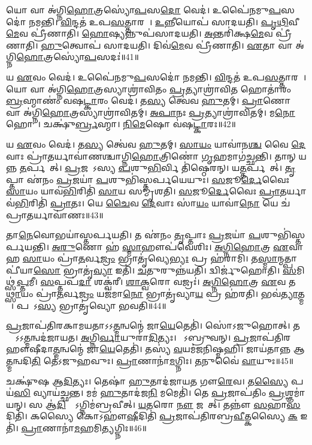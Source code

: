 𑌯𑍋 𑌵𑌾 𑌅॑𑌗𑍍𑌨𑌿\ul{𑌹𑍋}𑌤𑍍𑌰𑌸𑍍𑌯𑍋॑\ul{𑌪}𑌸\ul{𑌦𑍋} 𑌵𑍇𑌦॑।
𑌉𑌪𑍈॑𑌨𑌮𑍁\ul{𑌪}𑌸𑌦𑍋॑ 𑌨𑌮𑌨𑍍𑌤𑌿।
\ul{𑌵𑌿}𑌨𑍍𑌦𑌤॑ 𑌉𑌪\ul{𑌸}𑌤𑍍𑌤𑌾𑌰𑌮𑍍᳚।
\ul{𑌉}𑌨𑍍𑌨𑍀𑌯𑍋𑌪॑ 𑌸𑌾𑌦𑌯𑌤𑌿।
\ul{𑌪𑍃}\ul{𑌥𑌿}𑌵𑍀\ul{𑌮𑍇}𑌵 𑌪𑍍𑌰𑍀॑𑌣𑌾𑌤𑌿।
\ul{𑌹𑍋}𑌷𑍍𑌯𑌨𑍍𑌨𑍁𑌪॑𑌸𑌾𑌦𑌯𑌤𑌿।
\ul{𑌅}𑌨𑍍𑌤𑌰𑌿॑𑌕𑍍𑌷\ul{𑌮𑍇}𑌵 𑌪𑍍𑌰𑍀॑𑌣𑌾𑌤𑌿।
\ul{𑌹𑍁}𑌤𑍍𑌵𑍋𑌪॑ 𑌸𑌾𑌦𑌯𑌤𑌿।
𑌦𑌿𑌵॑\ul{𑌮𑍇}𑌵 𑌪𑍍𑌰𑍀॑𑌣𑌾𑌤𑌿।
\ul{𑌏}𑌤𑌾 𑌵𑌾 𑌅॑𑌗𑍍𑌨𑌿\ul{𑌹𑍋}𑌤𑍍𑌰𑌸𑍍𑌯𑍋॑\ul{𑌪}𑌸𑌦𑌃॑॥41॥

𑌯 \ul{𑌏}𑌵𑌂 𑌵𑍇𑌦॑।
𑌉𑌪𑍈॑𑌨𑌮𑍁\ul{𑌪}𑌸𑌦𑍋॑ 𑌨𑌮𑌨𑍍𑌤𑌿।
\ul{𑌵𑌿}𑌨𑍍𑌦𑌤॑ 𑌉𑌪\ul{𑌸}𑌤𑍍𑌤𑌾𑌰𑌮𑍍᳚।
𑌯𑍋 𑌵𑌾 𑌅॑𑌗𑍍𑌨𑌿\ul{𑌹𑍋}𑌤𑍍𑌰𑌸𑍍𑌯𑌾𑌶𑍍𑌰𑌾॑𑌵𑌿𑌤𑌂 \ul{𑌪𑍍𑌰}𑌤𑍍𑌯𑌾𑌶𑍍𑌰𑌾॑𑌵𑌿\ul{𑌤}\ul{} 𑌹𑍋𑌤𑌾॑𑌰𑌂 \ul{𑌬𑍍𑌰}𑌹𑍍𑌮𑌾𑌣𑌂॑ 𑌵𑌷\ul{𑌟𑍍𑌕𑌾}𑌰𑌂 𑌵𑍇𑌦॑।
𑌤\ul{𑌸𑍍𑌯} 𑌤𑍍𑌵𑍇॑𑌵 \ul{𑌹𑍁}𑌤𑌮𑍍।
\ul{𑌪𑍍𑌰𑌾}𑌣𑍋 𑌵𑌾 𑌅॑𑌗𑍍𑌨𑌿\ul{𑌹𑍋}𑌤𑍍𑌰𑌸𑍍𑌯𑌾𑌶𑍍𑌰𑌾॑𑌵𑌿𑌤𑌮𑍍।
\ul{𑌅}\ul{𑌪𑌾}𑌨𑌃 \ul{𑌪𑍍𑌰}𑌤𑍍𑌯𑌾𑌶𑍍𑌰𑌾॑𑌵𑌿𑌤𑌮𑍍।
𑌮\ul{𑌨𑍋} 𑌹𑍋𑌤𑌾᳚।
𑌚𑌕𑍍𑌷𑍁॑\ul{𑌰𑍍𑌬𑍍𑌰}𑌹𑍍𑌮𑌾।
\ul{𑌨𑌿}\ul{𑌮𑍇}𑌷𑍋 𑌵॑𑌷\ul{𑌟𑍍𑌕𑌾}𑌰𑌃॥42॥

𑌯 \ul{𑌏}𑌵𑌂 𑌵𑍇𑌦॑।
𑌤\ul{𑌸𑍍𑌯} 𑌤𑍍𑌵𑍇॑𑌵 \ul{𑌹𑍁}𑌤𑌮𑍍।
\ul{𑌸𑌾}\ul{𑌯𑌂} 𑌯𑌾𑌵𑌾॑𑌨\ul{𑌶𑍍𑌚} 𑌵𑍈 \ul{𑌦𑍇}𑌵𑌾𑌃 𑌪𑍍𑌰𑌾॑\ul{𑌤}𑌰𑍍𑌯𑌾𑌵𑌾॑𑌣𑌶𑍍𑌚𑌾𑌗𑍍𑌨𑌿\ul{𑌹𑍋}𑌤𑍍𑌰𑌿𑌣𑍋॑ \ul{𑌗𑍃}𑌹𑌮𑌾𑌗॑𑌚𑍍𑌛𑌨𑍍𑌤𑌿।
𑌤𑌾𑌨𑍍 𑌯𑌨𑍍𑌨 \ul{𑌤}𑌰𑍍𑌪𑌯𑍇᳚𑌤𑍍।
\ul{𑌪𑍍𑌰}𑌜𑌯𑌾᳚𑌽𑌸𑍍𑌯 \ul{𑌪}𑌶𑍁\ul{𑌭𑌿}𑌰𑍍𑌵𑌿 𑌤𑌿॑𑌷𑍍𑌠𑍇𑌰𑌨𑍍।
𑌯\ul{𑌤𑍍𑌤}𑌰𑍍𑌪𑌯𑍇᳚𑌤𑍍।
\ul{𑌤𑍃}𑌪𑍍𑌤𑌾 𑌏॑𑌨𑌂 \ul{𑌪𑍍𑌰}𑌜𑌯𑌾॑ \ul{𑌪}𑌶𑍁𑌭𑌿॑𑌸𑍍𑌤𑌰𑍍𑌪𑌯𑍇𑌯𑍁𑌃।
\ul{𑌸}𑌜𑍂\ul{𑌰𑍍𑌦𑍇}𑌵𑍈𑌃 \ul{𑌸𑌾}𑌯𑌂 𑌯𑌾𑌵॑\ul{𑌭𑌿}𑌰𑌿𑌤𑌿॑ \ul{𑌸𑌾}𑌯 𑌸𑌮𑍍𑌮𑍃॑𑌶𑌤𑌿।
\ul{𑌸}𑌜𑍂\ul{𑌰𑍍𑌦𑍇}𑌵𑍈𑌃 \ul{𑌪𑍍𑌰𑌾}𑌤𑌰𑍍𑌯𑌾𑌵॑\ul{𑌭𑌿}𑌰𑌿𑌤𑌿॑ \ul{𑌪𑍍𑌰𑌾}𑌤𑌃।
𑌯𑍇 \ul{𑌚𑍈}𑌵 \ul{𑌦𑍇}𑌵𑌾𑌃 𑌸𑌾॑\ul{𑌯𑌂} 𑌯𑌾𑌵𑌾॑\ul{𑌨𑍋} 𑌯𑍇 𑌚॑ 𑌪𑍍𑌰𑌾\ul{𑌤}𑌰𑍍𑌯𑌾𑌵𑌾॑𑌣𑌃॥43॥

𑌤𑌾\ul{𑌨𑍇}𑌵𑍋𑌭𑌯𑌾॑𑌸𑍍𑌤𑌰𑍍𑌪𑌯𑌤𑌿।
𑌤 𑌏॑𑌨𑌂 \ul{𑌤𑍃}𑌪𑍍𑌤𑌾𑌃 \ul{𑌪𑍍𑌰}𑌜𑌯𑌾॑ \ul{𑌪}𑌶𑍁𑌭𑌿॑𑌸𑍍𑌤𑌰𑍍𑌪\-𑌯𑌨𑍍𑌤𑌿।
\ul{𑌅}\ul{𑌰𑍁}𑌣𑍋 𑌹॑ \ul{𑌸𑍍𑌮𑌾}𑌹𑍗𑌪॑𑌵𑍇𑌶𑌿𑌃।
\ul{𑌅}\ul{𑌗𑍍𑌨𑌿}\ul{𑌹𑍋}𑌤𑍍𑌰 \ul{𑌏}𑌵𑌾𑌹 \ul{𑌸𑌾}𑌯𑌂 𑌪𑍍𑌰𑌾॑\ul{𑌤}𑌰𑍍𑌵\ul{𑌜𑍍𑌰𑌂} 𑌭𑍍𑌰𑌾𑌤𑍃॑𑌵𑍍𑌯𑍇\ul{𑌭𑍍𑌯𑌃} 𑌪𑍍𑌰 𑌹॑𑌰𑌾𑌮𑌿।
𑌤\ul{𑌸𑍍𑌮𑌾}𑌨𑍍𑌮𑌤𑍍𑌪𑌾𑌪𑍀॑𑌯𑌾\ul{𑌸𑍋} 𑌭𑍍𑌰𑌾𑌤𑍃॑\ul{𑌵𑍍𑌯𑌾} 𑌇𑌤𑌿॑।
\ul{𑌚}𑌤𑍁𑌰𑍁𑌨𑍍𑌨॑𑌯𑌤𑌿।
𑌦𑍍𑌵𑌿𑌰𑍍𑌜𑍁॑𑌹𑍋𑌤𑌿।
\ul{𑌸}𑌮𑌿𑌥𑍍𑌸॑\ul{𑌪𑍍𑌤}𑌮𑍀।
\ul{𑌸}𑌪𑍍𑌤𑌪॑\ul{𑌦𑌾} 𑌶𑌕𑍍𑌵॑𑌰𑍀।
\ul{𑌶𑌾}\ul{𑌕𑍍𑌵}𑌰𑍋 𑌵𑌜𑍍𑌰𑌃॑।
\ul{𑌅}\ul{𑌗𑍍𑌨𑌿}\ul{𑌹𑍋}𑌤𑍍𑌰 \ul{𑌏}𑌵 𑌤\ul{𑌥𑍍𑌸𑌾}𑌯𑌂 𑌪𑍍𑌰𑌾॑\ul{𑌤}𑌰𑍍𑌵\ul{𑌜𑍍𑌰𑌂} 𑌯𑌜॑𑌮𑌾\ul{𑌨𑍋} 𑌭𑍍𑌰𑌾𑌤𑍃॑𑌵𑍍𑌯𑌾\ul{𑌯} 𑌪𑍍𑌰 𑌹॑𑌰𑌤𑌿।
𑌭𑌵॑\ul{𑌤𑍍𑌯𑌾}𑌤𑍍𑌮𑌨𑌾᳚।
𑌪𑌰𑌾᳚𑌽\ul{𑌸𑍍𑌯} 𑌭𑍍𑌰𑌾𑌤𑍃॑𑌵𑍍𑌯𑍋 𑌭𑌵𑌤𑌿॥44॥\anuvakamend[\ul{𑌬}\ul{𑌰𑍍}𑌹𑌿𑌃 \ul{𑌪𑍍𑌰𑌾}𑌤𑌰𑍍\mbox{}\ul{𑌹𑍁}𑌤𑌾𑌦𑍍𑌯𑌾॑𑌯 𑌜𑌾𑌯𑌤𑍇 𑌰𑍁𑌨𑍍𑌧𑍇\-𑌽\ul{𑌸𑌾}𑌮𑌾 𑌕॑𑌰𑍋\ul{𑌤𑍍𑌯𑍇}𑌤𑌾 𑌵𑌾 𑌅॑𑌗𑍍𑌨𑌿\ul{𑌹𑍋}𑌤𑍍𑌰𑌸𑍍𑌯𑍋॑\ul{𑌪}𑌸𑌦𑍋॑ 𑌵𑌷\ul{𑌟𑍍𑌕𑌾}𑌰𑌶𑍍𑌚॑ 𑌪𑍍𑌰𑌾\ul{𑌤}𑌰𑍍𑌯𑌾𑌵𑌾॑\ul{𑌣𑍋} 𑌵\ul{𑌜𑍍𑌰}𑌸𑍍𑌤𑍍𑌰𑍀𑌣𑌿॑ 𑌚]

\ul{𑌪𑍍𑌰}𑌜𑌾𑌪॑𑌤𑌿𑌰𑌕𑌾𑌮𑌯𑌤𑌾\-𑌽𑌽\ul{𑌤𑍍𑌮}𑌨𑍍𑌵𑌨𑍍𑌮𑍇॑ 𑌜𑌾\ul{𑌯𑍇}𑌤𑍇𑌤𑌿॑।
𑌸𑍋॑𑌽𑌜𑍁𑌹𑍋𑌤𑍍।
𑌤𑌸𑍍𑌯𑌾᳚\-𑌽𑌽\ul{𑌤𑍍𑌮}𑌨𑍍𑌵𑌦॑𑌜𑌾𑌯𑌤।
\ul{𑌅}𑌗𑍍𑌨𑌿\ul{𑌰𑍍𑌵𑌾}𑌯𑍁𑌰𑌾॑\ul{𑌦𑌿}𑌤𑍍𑌯𑌃।
𑌤𑍇᳚𑌽𑌬𑍍𑌰𑍁𑌵𑌨𑍍।
\ul{𑌪𑍍𑌰}𑌜𑌾𑌪॑𑌤𑌿𑌰𑌹𑍗𑌷𑍀𑌦𑌾\ul{𑌤𑍍𑌮}𑌨𑍍𑌵𑌨𑍍𑌮𑍇॑ 𑌜𑌾\ul{𑌯𑍇}𑌤𑍇𑌤𑌿॑।
𑌤𑌸𑍍𑌯॑ \ul{𑌵}𑌯𑌮॑𑌜𑌨𑌿𑌷𑍍𑌮𑌹𑌿।
𑌜𑌾𑌯॑𑌤𑌾𑌨𑍍𑌨 𑌆\ul{𑌤𑍍𑌮}𑌨𑍍𑌵𑌦𑌿\ul{𑌤𑌿} 𑌤𑍇॑\-𑌽𑌜𑍁𑌹𑌵𑍁𑌃।
\ul{𑌪𑍍𑌰𑌾}𑌣𑌾𑌨𑌾॑\ul{𑌮}𑌗𑍍𑌨𑌿𑌃।
\ul{𑌤}𑌨𑍁𑌵𑍈॑ \ul{𑌵𑌾}𑌯𑍁𑌃॥45॥

𑌚𑌕𑍍𑌷𑍁॑𑌷 𑌆\ul{𑌦𑌿}𑌤𑍍𑌯𑌃।
𑌤𑍇𑌷𑌾॑ \ul{𑌹𑍁}𑌤𑌾𑌦॑𑌜𑌾𑌯\ul{𑌤} 𑌗𑍗\ul{𑌰𑍇}𑌵।
𑌤\ul{𑌸𑍍𑌯𑍈} 𑌪𑌯॑\ul{𑌸𑌿} 𑌵𑍍𑌯𑌾𑌯॑𑌚𑍍𑌛𑌨𑍍𑌤।
𑌮𑌮॑ \ul{𑌹𑍁}𑌤𑌾𑌦॑𑌜\ul{𑌨𑌿} 𑌮𑌮𑍇𑌤𑌿॑।
𑌤𑍇 \ul{𑌪𑍍𑌰}𑌜𑌾𑌪॑𑌤𑌿𑌂 \ul{𑌪𑍍𑌰}𑌶𑍍𑌞𑌮𑌾॑𑌯𑌨𑍍।
𑌸 𑌆॑\ul{𑌦𑌿}𑌤𑍍𑌯𑍋᳚\-𑌽𑌗𑍍𑌨𑌿𑌮॑𑌬𑍍𑌰𑌵𑍀𑌤𑍍।
\ul{𑌯}\ul{𑌤}𑌰𑍋 \ul{𑌨𑍗} 𑌜𑌯𑌾᳚𑌤𑍍।
𑌤𑌨𑍍𑌨𑍗॑ \ul{𑌸}𑌹𑌾\ul{𑌸}𑌦𑌿𑌤𑌿॑।
𑌕𑌸𑍍𑌯𑍈 𑌕𑍋𑌽𑌹𑍗॑\ul{𑌷𑍀}𑌦𑌿𑌤𑌿॑ \ul{𑌪𑍍𑌰}𑌜𑌾𑌪॑𑌤𑌿𑌰𑌬𑍍𑌰\ul{𑌵𑍀}𑌤𑍍𑌕𑌸𑍍𑌯𑍈 \ul{𑌕} 𑌇𑌤𑌿॑।
\ul{𑌪𑍍𑌰𑌾}𑌣𑌾𑌨𑌾॑\ul{𑌮}𑌹𑌮𑌿\ul{𑌤𑍍𑌯}𑌗𑍍𑌨𑌿𑌃॥46॥

